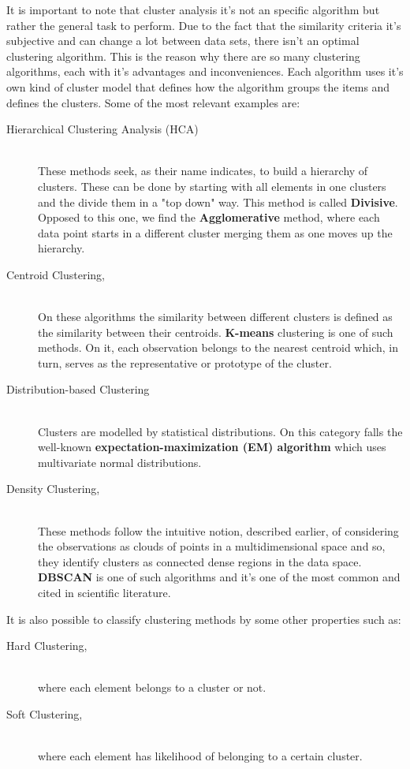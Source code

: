 It is important to note that cluster analysis it's not an specific algorithm but rather the general task to perform. Due to the fact that the similarity criteria it's subjective and can change a lot between data sets, there isn't an optimal clustering algorithm. This is the reason why there are so many  clustering algorithms, each with it's advantages and inconveniences. Each algorithm uses it's own kind of cluster model that defines how the algorithm groups the items and defines the clusters. Some of the most relevant examples are:
\label{subsec:algorithm_kinds}
\begin{description}
\item [Hierarchical Clustering Analysis (HCA)] \hfill \\ 
These methods seek, as their name indicates, to build a hierarchy of clusters. These can be done by starting with all elements in one clusters and the divide them in a "top down" way. This method is called \textbf{Divisive}. Opposed to this one, we find the \textbf{Agglomerative} method, where each data point starts in a different cluster merging them as one moves up the hierarchy.
\item [Centroid Clustering,] \hfill \\ 
On these algorithms the similarity between different clusters is defined as the similarity between their centroids. \textbf{K-means} clustering is one of such methods. On it, each observation belongs to the nearest centroid which, in turn, serves as the representative or prototype of the cluster.
\item [Distribution-based Clustering] \hfill \\ 
Clusters are modelled by statistical distributions. On this category falls the well-known \textbf{expectation-maximization (EM) algorithm} which uses multivariate normal distributions.
\item [Density Clustering,] \hfill \\ 
These methods follow the intuitive notion, described earlier, of considering the observations as clouds of points in a multidimensional space and so, they identify clusters as connected dense regions in the data space. \textbf{DBSCAN} is one of such algorithms and it's one of the most common and cited in scientific literature. 
\end{description}


It is also possible to classify clustering methods by some other properties such as:

\begin{description}
\item [Hard Clustering,] \hfill \\ where each element belongs to a cluster or not.
\item [Soft Clustering,] \hfill \\ where each element has likelihood of belonging to a certain cluster.
\end{description}




